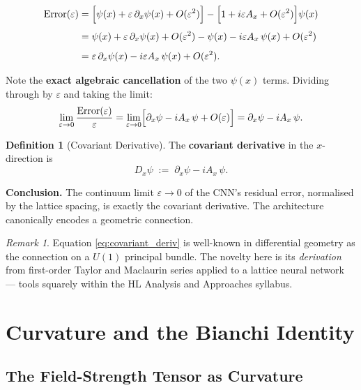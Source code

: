\documentclass[12pt, a4paper]{article}
\theoremstyle{plain}
\theoremstyle{definition}
\newtheorem{definition}[theorem]{Definition}
\theoremstyle{remark}
\newtheorem{remark}[theorem]{Remark}
\newcommand{\eps}{\varepsilon}
\newcommand{\psifield}{\psi}
\begin{document}
\begin{align}
  \mathrm{Error}(\eps)
  &= \Bigl[\psifield(x) + \eps\,\partial_x\psifield(x) + O(\eps^2)\Bigr]
     - \Bigl[1 + i\eps A_x + O(\eps^2)\Bigr]\psifield(x) \notag\\[4pt]
  &= \psifield(x) + \eps\,\partial_x\psifield(x) + O(\eps^2)
     - \psifield(x) - i\eps A_x\,\psifield(x) + O(\eps^2) \notag\\[4pt]
  &= \eps\,\partial_x\psifield(x) - i\eps A_x\,\psifield(x) + O(\eps^2).
  \label{eq:error_expanded}
\end{align}

Note the \textbf{exact algebraic cancellation} of the two $\psifield(x)$ terms.  Dividing through by $\eps$ and taking the limit:
\[
  \lim_{\eps\to 0}\frac{\mathrm{Error}(\eps)}{\eps}
  = \lim_{\eps\to 0}\Bigl[\partial_x\psifield - i A_x\,\psifield + O(\eps)\Bigr]
  = \partial_x\psifield - i A_x\,\psifield.
\]

\begin{definition}[Covariant Derivative]
The \textbf{covariant derivative} in the $x$-direction is
\begin{equation}
  \boxed{D_x\psifield \;:=\; \partial_x\psifield - i A_x\,\psifield.}
  \label{eq:covariant_deriv}
\end{equation}
\end{definition}

\textbf{Conclusion.}  The continuum limit $\eps\to 0$ of the CNN's residual error, normalised by the lattice spacing, is exactly the covariant derivative.  The architecture canonically encodes a geometric connection.

\begin{remark}
  Equation \eqref{eq:covariant_deriv} is well-known in differential geometry as the connection on a $U(1)$ principal bundle.  The novelty here is its \emph{derivation} from first-order Taylor and Maclaurin series applied to a lattice neural network — tools squarely within the HL Analysis and Approaches syllabus.
\end{remark}

\section{Curvature and the Bianchi Identity}
\label{sec:curvature}

\subsection{The Field-Strength Tensor as Curvature}
\end{document}
